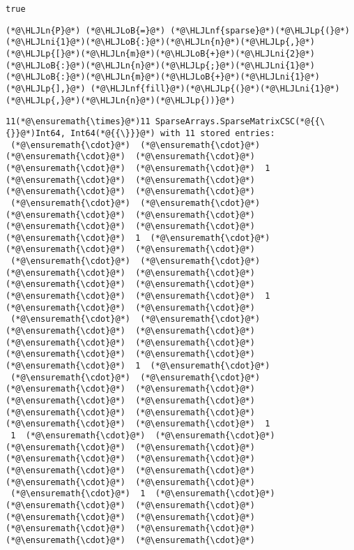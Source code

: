 \documentclass[12pt,landscape]{article}
\newcommand{\HLJLn}[1]{#1}
\newcommand{\HLJLnf}[1]{\textcolor[RGB]{66,102,213}{#1}}
\newcommand{\HLJLni}[1]{\textcolor[RGB]{59,151,46}{#1}}
\newcommand{\HLJLoB}[1]{\textcolor[RGB]{102,102,102}{\textbf{#1}}}
\newcommand{\HLJLp}[1]{#1}
\begin{document}
{\begin{lstlisting}
true
\end{lstlisting}
\newpage

\begin{lstlisting}
(*@\HLJLn{P}@*) (*@\HLJLoB{=}@*) (*@\HLJLnf{sparse}@*)(*@\HLJLp{(}@*)(*@\HLJLni{1}@*)(*@\HLJLoB{:}@*)(*@\HLJLn{n}@*)(*@\HLJLp{,}@*) (*@\HLJLp{[}@*)(*@\HLJLn{m}@*)(*@\HLJLoB{+}@*)(*@\HLJLni{2}@*)(*@\HLJLoB{:}@*)(*@\HLJLn{n}@*)(*@\HLJLp{;}@*)(*@\HLJLni{1}@*)(*@\HLJLoB{:}@*)(*@\HLJLn{m}@*)(*@\HLJLoB{+}@*)(*@\HLJLni{1}@*)(*@\HLJLp{],}@*) (*@\HLJLnf{fill}@*)(*@\HLJLp{(}@*)(*@\HLJLni{1}@*)(*@\HLJLp{,}@*)(*@\HLJLn{n}@*)(*@\HLJLp{))}@*)
\end{lstlisting}

\begin{lstlisting}
11(*@\ensuremath{\times}@*)11 SparseArrays.SparseMatrixCSC(*@{{\{}}@*)Int64, Int64(*@{{\}}}@*) with 11 stored entries:
 (*@\ensuremath{\cdot}@*)  (*@\ensuremath{\cdot}@*)  (*@\ensuremath{\cdot}@*)  (*@\ensuremath{\cdot}@*)  (*@\ensuremath{\cdot}@*)  (*@\ensuremath{\cdot}@*)  1  (*@\ensuremath{\cdot}@*)  (*@\ensuremath{\cdot}@*)  (*@\ensuremath{\cdot}@*)  (*@\ensuremath{\cdot}@*)
 (*@\ensuremath{\cdot}@*)  (*@\ensuremath{\cdot}@*)  (*@\ensuremath{\cdot}@*)  (*@\ensuremath{\cdot}@*)  (*@\ensuremath{\cdot}@*)  (*@\ensuremath{\cdot}@*)  (*@\ensuremath{\cdot}@*)  1  (*@\ensuremath{\cdot}@*)  (*@\ensuremath{\cdot}@*)  (*@\ensuremath{\cdot}@*)
 (*@\ensuremath{\cdot}@*)  (*@\ensuremath{\cdot}@*)  (*@\ensuremath{\cdot}@*)  (*@\ensuremath{\cdot}@*)  (*@\ensuremath{\cdot}@*)  (*@\ensuremath{\cdot}@*)  (*@\ensuremath{\cdot}@*)  (*@\ensuremath{\cdot}@*)  1  (*@\ensuremath{\cdot}@*)  (*@\ensuremath{\cdot}@*)
 (*@\ensuremath{\cdot}@*)  (*@\ensuremath{\cdot}@*)  (*@\ensuremath{\cdot}@*)  (*@\ensuremath{\cdot}@*)  (*@\ensuremath{\cdot}@*)  (*@\ensuremath{\cdot}@*)  (*@\ensuremath{\cdot}@*)  (*@\ensuremath{\cdot}@*)  (*@\ensuremath{\cdot}@*)  1  (*@\ensuremath{\cdot}@*)
 (*@\ensuremath{\cdot}@*)  (*@\ensuremath{\cdot}@*)  (*@\ensuremath{\cdot}@*)  (*@\ensuremath{\cdot}@*)  (*@\ensuremath{\cdot}@*)  (*@\ensuremath{\cdot}@*)  (*@\ensuremath{\cdot}@*)  (*@\ensuremath{\cdot}@*)  (*@\ensuremath{\cdot}@*)  (*@\ensuremath{\cdot}@*)  1
 1  (*@\ensuremath{\cdot}@*)  (*@\ensuremath{\cdot}@*)  (*@\ensuremath{\cdot}@*)  (*@\ensuremath{\cdot}@*)  (*@\ensuremath{\cdot}@*)  (*@\ensuremath{\cdot}@*)  (*@\ensuremath{\cdot}@*)  (*@\ensuremath{\cdot}@*)  (*@\ensuremath{\cdot}@*)  (*@\ensuremath{\cdot}@*)
 (*@\ensuremath{\cdot}@*)  1  (*@\ensuremath{\cdot}@*)  (*@\ensuremath{\cdot}@*)  (*@\ensuremath{\cdot}@*)  (*@\ensuremath{\cdot}@*)  (*@\ensuremath{\cdot}@*)  (*@\ensuremath{\cdot}@*)  (*@\ensuremath{\cdot}@*)  (*@\ensuremath{\cdot}@*)  (*@\ensuremath{\cdot}@*)

\end{lstlisting}}
\end{document}
